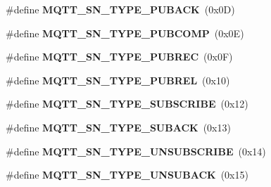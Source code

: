 \begin{DoxyCompactItemize}
\item 
\hypertarget{group__MQTT__SN__CONTROL_ga5bc44c53d2905a5242a3b72d44c125b2}{\#define {\bfseries M\+Q\+T\+T\+\_\+\+S\+N\+\_\+\+T\+Y\+P\+E\+\_\+\+P\+U\+B\+A\+C\+K}~(0x0\+D)}\label{group__MQTT__SN__CONTROL_ga5bc44c53d2905a5242a3b72d44c125b2}

\item 
\hypertarget{group__MQTT__SN__CONTROL_gacef39c4b8c3dd36ed4caf90f6a716585}{\#define {\bfseries M\+Q\+T\+T\+\_\+\+S\+N\+\_\+\+T\+Y\+P\+E\+\_\+\+P\+U\+B\+C\+O\+M\+P}~(0x0\+E)}\label{group__MQTT__SN__CONTROL_gacef39c4b8c3dd36ed4caf90f6a716585}

\item 
\hypertarget{group__MQTT__SN__CONTROL_gac4953c83079abc9804fce7dca7b0a648}{\#define {\bfseries M\+Q\+T\+T\+\_\+\+S\+N\+\_\+\+T\+Y\+P\+E\+\_\+\+P\+U\+B\+R\+E\+C}~(0x0\+F)}\label{group__MQTT__SN__CONTROL_gac4953c83079abc9804fce7dca7b0a648}

\item 
\hypertarget{group__MQTT__SN__CONTROL_ga74daeb038d5cf996c680fc34b187dfba}{\#define {\bfseries M\+Q\+T\+T\+\_\+\+S\+N\+\_\+\+T\+Y\+P\+E\+\_\+\+P\+U\+B\+R\+E\+L}~(0x10)}\label{group__MQTT__SN__CONTROL_ga74daeb038d5cf996c680fc34b187dfba}

\item 
\hypertarget{group__MQTT__SN__CONTROL_ga1e4f5d7bc584d5ffcda760303ab76904}{\#define {\bfseries M\+Q\+T\+T\+\_\+\+S\+N\+\_\+\+T\+Y\+P\+E\+\_\+\+S\+U\+B\+S\+C\+R\+I\+B\+E}~(0x12)}\label{group__MQTT__SN__CONTROL_ga1e4f5d7bc584d5ffcda760303ab76904}

\item 
\hypertarget{group__MQTT__SN__CONTROL_ga6db4e874ad63924de121a89d4bcd559d}{\#define {\bfseries M\+Q\+T\+T\+\_\+\+S\+N\+\_\+\+T\+Y\+P\+E\+\_\+\+S\+U\+B\+A\+C\+K}~(0x13)}\label{group__MQTT__SN__CONTROL_ga6db4e874ad63924de121a89d4bcd559d}

\item 
\hypertarget{group__MQTT__SN__CONTROL_ga0aaddbe1b0ebd1ece45ada17e618e560}{\#define {\bfseries M\+Q\+T\+T\+\_\+\+S\+N\+\_\+\+T\+Y\+P\+E\+\_\+\+U\+N\+S\+U\+B\+S\+C\+R\+I\+B\+E}~(0x14)}\label{group__MQTT__SN__CONTROL_ga0aaddbe1b0ebd1ece45ada17e618e560}

\item 
\hypertarget{group__MQTT__SN__CONTROL_ga494ee75d7c290823f3738a4d77beea97}{\#define {\bfseries M\+Q\+T\+T\+\_\+\+S\+N\+\_\+\+T\+Y\+P\+E\+\_\+\+U\+N\+S\+U\+B\+A\+C\+K}~(0x15)}\label{group__MQTT__SN__CONTROL_ga494ee75d7c290823f3738a4d77beea97}


\end{DoxyCompactItemize}
